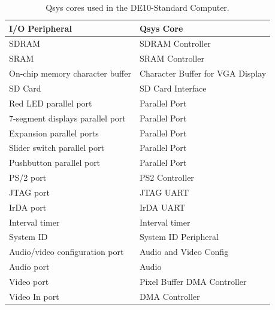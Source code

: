 \documentclass[11pt, twoside, pdftex]{article}
\newcommand{\commonFiles}{../../../common/doc}
\newcommand{\systemName}{DE10-Standard Computer}
\begin{document}


\begin{table}[h]
    \begin{center}
    \begin{tabular}{l|l}
            \textbf{I/O Peripheral}
            & \textbf{Qsys Core}
        \\\hline
            SDRAM
            & SDRAM Controller
        \\
            SRAM
        &   SRAM Controller
        \\
            On-chip memory character buffer
				& Character Buffer for VGA Display
        \\
            SD Card
        &   SD Card Interface
        \\
            Red LED parallel port
				& Parallel Port
        \\
            7-segment displays parallel port
				& Parallel Port
        \\
            Expansion parallel ports
				& Parallel Port
        \\
            Slider switch parallel port
				& Parallel Port
        \\
            Pushbutton parallel port
				& Parallel Port
        \\
            PS/2 port
				& PS2 Controller
        \\
            JTAG port
				& JTAG UART
        \\
            IrDA port
				& IrDA UART
        \\
            Interval timer
				& Interval timer 
        \\
            System ID
				& System ID Peripheral
        \\
            Audio/video configuration port
				& Audio and Video Config
        \\
            Audio port
				& Audio
        \\
            Video port
				& Pixel Buffer DMA Controller
        \\
            Video In port
				& DMA Controller
        \\
    \end{tabular}
    \caption{Qsys cores used in the \systemName.}
    \label{tab:sopcnames}
    \end{center}
\end{table}


\end{document}
